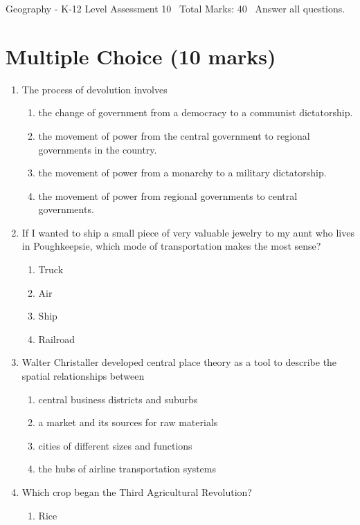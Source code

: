 \documentclass[12pt]{article}
\begin{document}
\begin{center}
Geography - K-12 Level Assessment 10 \
Total Marks: 40 \
Answer all questions.
\end{center}

\section*{Multiple Choice (10 marks)}
\begin{enumerate}[label=\arabic*.]
\item The process of devolution involves
\begin{enumerate}[label=(\alph*)]
    \item the change of government from a democracy to a communist dictatorship.
    \item the movement of power from the central government to regional governments in the country.
    \item the movement of power from a monarchy to a military dictatorship.
    \item the movement of power from regional governments to central governments.
\end{enumerate}
\item If I wanted to ship a small piece of very valuable jewelry to my aunt who lives in Poughkeepsie, which mode of transportation makes the most sense?
\begin{enumerate}[label=(\alph*)]
    \item Truck
    \item Air
    \item Ship
    \item Railroad
\end{enumerate}
\item Walter Christaller developed central place theory as a tool to describe the spatial relationships between
\begin{enumerate}[label=(\alph*)]
    \item central business districts and suburbs
    \item a market and its sources for raw materials
    \item cities of different sizes and functions
    \item the hubs of airline transportation systems
\end{enumerate}
\item Which crop began the Third Agricultural Revolution?
\begin{enumerate}[label=(\alph*)]
    \item Rice

\end{enumerate}
\end{enumerate}
\end{document}
